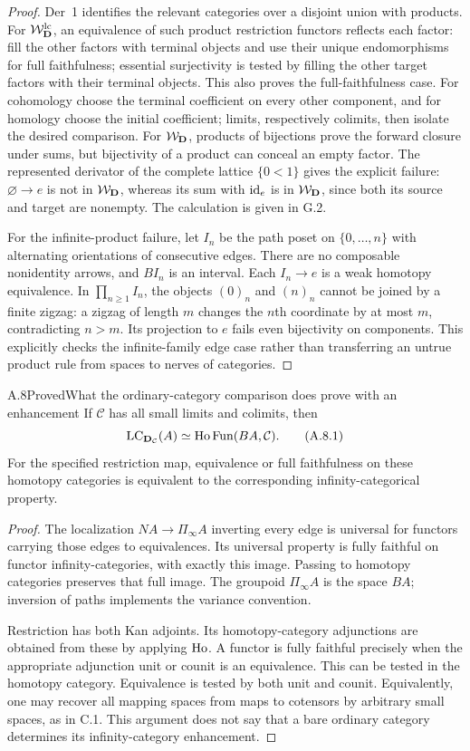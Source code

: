\begin{proof}
Der~1 identifies the relevant categories over a disjoint union with
products. For $\mathcal W_{\mathbf D}^{\mathrm{lc}}$, an equivalence of such product restriction
functors reflects each factor: fill the other factors with terminal
objects and use their unique endomorphisms for full faithfulness;
essential surjectivity is tested by filling the other target factors
with their terminal objects. This also proves the full-faithfulness
case. For cohomology choose the terminal coefficient on every other
component, and for homology choose the initial coefficient; limits,
respectively colimits, then isolate the desired comparison. For
$\mathcal W_{\mathbf D}$, products of bijections prove the forward closure under sums,
but bijectivity of a product can conceal an empty factor. The
represented derivator of the complete lattice $\{0<1\}$ gives the
explicit failure: $\varnothing\to e$ is not in $\mathcal W_{\mathbf D}$, whereas its
sum with $\mathrm{id}_e$ is in $\mathcal W_{\mathbf D}$, since both its source and target are
nonempty. The calculation is given in G.2.

For the infinite-product failure, let $I_n$ be the path poset on
$\{0,\ldots,n\}$ with alternating orientations of consecutive
edges. There are no composable nonidentity arrows, and $BI_n$ is an
interval. Each $I_n\to e$ is a weak homotopy equivalence. In
$\prod_{n\geq1}I_n$, the objects $(0)_n$ and $(n)_n$ cannot be joined
by a finite zigzag: a zigzag of length $m$ changes the $n$th coordinate
by at most $m$, contradicting $n>m$. Its projection to $e$ fails even
bijectivity on components. This explicitly checks the infinite-family
edge case rather than transferring an untrue product rule from spaces
to nerves of categories.
\end{proof}

\begin{claim}{A.8}{Proved}{What the ordinary-category comparison does prove with an enhancement}
If $\mathcal C$ has all small limits and colimits, then
\[
 \operatorname{LC}_{\mathbf D_{\mathcal C}}(A)\simeq
 \operatorname{Ho}\operatorname{Fun}(BA,\mathcal C).
 \tag{A.8.1}
\]
For the specified restriction map, equivalence or full faithfulness
on these homotopy categories is equivalent to the corresponding
infinity-categorical property.
\end{claim}
\begin{proof}
The localization $NA\to\Pi_\infty A$ inverting every edge is
universal for functors carrying those edges to equivalences. Its
universal property is fully faithful on functor infinity-categories,
with exactly this image. Passing to homotopy categories preserves
that full image. The groupoid $\Pi_\infty A$ is the space $BA$;
inversion of paths implements the variance convention.

Restriction has both Kan adjoints. Its homotopy-category adjunctions
are obtained from these by applying $\operatorname{Ho}$. A functor is fully
faithful precisely when the appropriate adjunction unit or counit
is an equivalence. This can be tested in the homotopy category.
Equivalence is tested by both unit and counit. Equivalently, one
may recover all mapping spaces from maps to cotensors by arbitrary
small spaces, as in C.1. This argument does not say that a bare
ordinary category determines its infinity-category enhancement.
\end{proof}
